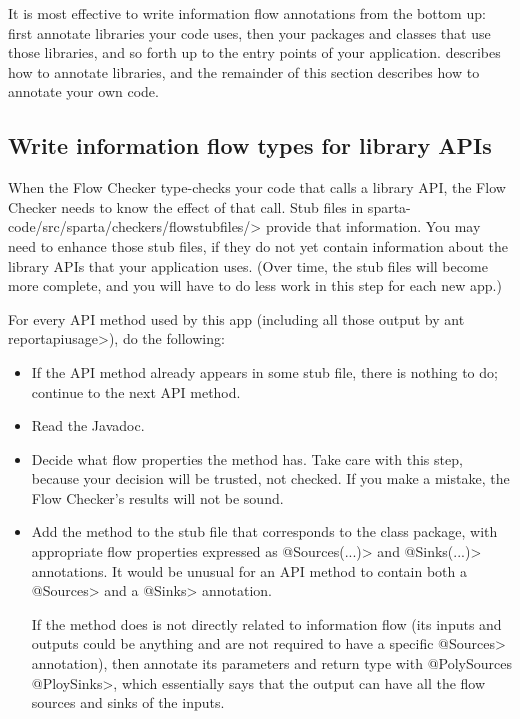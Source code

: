It is most effective to write information flow annotations from the bottom
up:  first annotate libraries your code uses, then your packages and
classes that use those libraries, and so forth up to the entry points of
your application.
 describes how to annotate libraries, and
the remainder of this section describes how to annotate your own code.


\subsection{Write information flow types for library APIs\label{flow-task-annotate-apis}}

When the Flow Checker type-checks your code that calls a library API, the
Flow Checker needs to know the effect of that call.  
Stub files in \<sparta-code/src/sparta/checkers/flowstubfiles/> provide
that information.  You may need to enhance those stub files, if they do not
yet contain information about the library APIs that your application uses.
(Over time, the stub files will become more complete, and you will have to
do less work in this step for each new app.)

For every API method used by this app (including all those output by \<ant
reportapiusage>), do the following:
\begin{itemize}
\item
If the API method already appears in some stub file, there is nothing to
do; continue to the next API method.

\item
Read the Javadoc.
\item
Decide what flow properties the method has.  Take care with this step,
because your decision will be trusted, not checked.  If you make a mistake,
the Flow Checker's results will not be sound.
\item
Add the method to the stub file that corresponds to the class package, with
appropriate flow properties expressed as \<@Sources(...)> and
\<@Sinks(...)> annotations.
It would be unusual for an API method to contain both a \<@Sources>
and a \<@Sinks> annotation.

If the method does is not directly related to information flow (its inputs
and outputs could be anything and are not required to have a specific
\<@Sources> annotation), then annotate its parameters and return type
with \<@PolySources @PloySinks>, which essentially says that the
output can have all the flow sources and sinks of the inputs.
\end{itemize}

